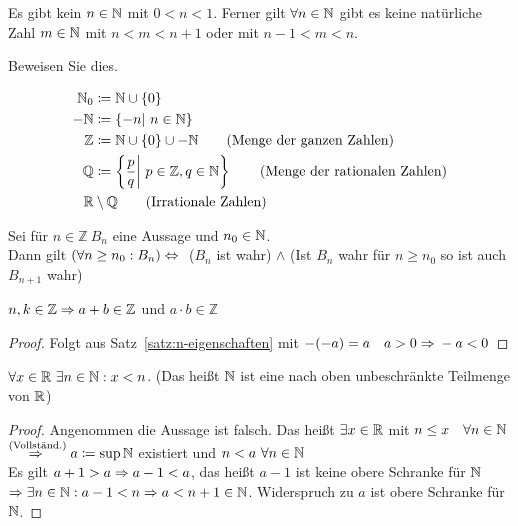 \begin{korollar}
    \label{korollar:4.2.7}
    Es gibt kein $n\in\mathbb{N}$ mit $0<n<1$. Ferner gilt $\forall n\in\mathbb{N}$ gibt es keine natürliche Zahl $m\in\mathbb{N}$ mit $n<m<n+1$ oder mit $n-1<m<n$.
\end{korollar}
\begin{uebung}
    Beweisen Sie dies.
\end{uebung}
\begin{notation}[Zahlenmengen]
    \begin{align*}
        \mathbb{N}_0 &\coloneqq \mathbb{N}\cup\left\{0\right\}\\
        \mathbb{-N} &\coloneqq \left\{-n|~n\in\mathbb{N}\right\}\\
        \mathbb{Z} &\coloneqq \mathbb{N}\cup\left\{0\right\}\cup\mathbb{-N} \tag{Menge der ganzen Zahlen}\\
        \mathbb{Q} &\coloneqq\left\{\frac{p}{q}\middle|~p\in\mathbb{Z}, q\in\mathbb{N}\right\} \tag{Menge der rationalen Zahlen}\\
        \mathbb{R}&\setminus\mathbb{Q}\tag{Irrationale Zahlen}
    \end{align*}
\end{notation}
\begin{bemerkung}
    Sei für $n\in\mathbb{Z}~B_n$ eine Aussage und $n_0\in\mathbb{N}$.\\
    Dann gilt $\left(\forall n\geq n_0: B_n\right) \Leftrightarrow{}$ ($B_n$ ist wahr) $\land$ (Ist $B_n$ wahr für $n\geq n_0$ so ist auch $B_{n+1}$ wahr)
\end{bemerkung}

\begin{satz}
    $n,k\in\mathbb{Z} \Rightarrow{} a +b \in\mathbb{Z}$ und $a\cdot b \in\mathbb{Z}$
    \begin{proof}
        Folgt aus Satz~\ref{satz:n-eigenschaften} mit $-(-a) = a\quad a > 0 \Rightarrow{} -a < 0$
    \end{proof}
\end{satz}

\begin{satz}
    $\forall x\in\mathbb{R}~\exists n\in\mathbb{N}: x < n$.
    (Das heißt $\mathbb{N}$ ist eine nach oben unbeschränkte Teilmenge von $\mathbb{R}$)
    \begin{proof}
        Angenommen die Aussage ist falsch. Das heißt $\exists x\in\mathbb{R}$ mit $n\leq x\quad\forall n\in\mathbb{N}$\\
        $\overset{\text{(Vollständ.)}}{\Rightarrow{}} a\coloneqq \sup\mathbb{N}$ existiert und $n<a~\forall n\in\mathbb{N}$\\
        Es gilt $a+1 > a \Rightarrow{} a - 1 < a$, das heißt $a-1$ ist keine obere Schranke für $\mathbb{N}$\\
        $\Rightarrow{} \exists n\in\mathbb{N}: a-1<n \Rightarrow{} a < n + 1 \in\mathbb{N}$. Widerspruch zu $a$ ist obere Schranke für $\mathbb{N}$.
    \end{proof}
\end{satz}

